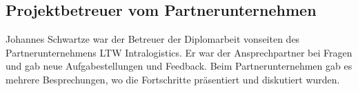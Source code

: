 
\subsection{Projektbetreuer vom Partnerunternehmen}
Johannes Schwartze war der Betreuer der Diplomarbeit vonseiten des Partnerunternehmens LTW Intralogistics. Er war der Ansprechpartner bei Fragen und gab neue Aufgabestellungen und Feedback. Beim Partnerunternehmen gab es mehrere Besprechungen, wo die Fortschritte präsentiert und diskutiert wurden.  \\